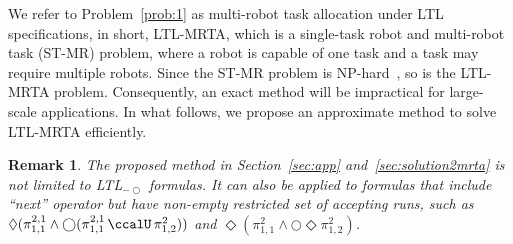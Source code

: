 \documentclass[Afour,sageh,times]{sagej}
\newtheorem{rem}[thm]{Remark}
\renewcommand{\ap}[3]{\mathcal{\pi}_{{#1},{#2}}^{#3}}
\begin{document}
We refer to Problem~\ref{prob:1} as multi-robot task allocation under LTL specifications, in short, LTL-MRTA, which is a single-task robot and multi-robot task (ST-MR) problem, where a robot is capable of one task and a task may require multiple robots. Since the ST-MR problem is NP-hard~\cite{korsah2013comprehensive,nunes2017taxonomy}, so is the LTL-MRTA problem. Consequently, an exact method will be impractical for large-scale applications. In what follows, we propose an approximate method to solve LTL-MRTA efficiently.

\begin{rem}
The proposed method in Section~\ref{sec:app} and~\ref{sec:solution2mrta} is not limited to  LTL$_{-\bigcirc}$ formulas. It can also be applied to  formulas that include ``next'' operator but have non-empty restricted set of accepting runs, such as $\Diamond(\ap{1}{1}{2,1} \wedge \bigcirc (\ap{1}{1}{2,1} \,\ccalU\, \ap{1}{2}{2}))$ and $\Diamond (\ap{1}{1}{2}  \wedge \bigcirc \Diamond \ap{1}{2}{2})$.
\end{rem}
\end{document}
